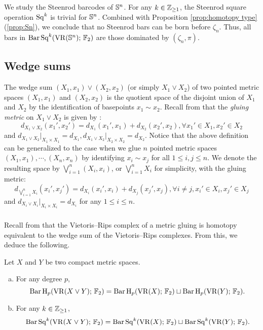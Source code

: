 \subsubsection{} We study the Steenrod barcodes of $\mathbb{S}^n$.
For any $k \in \mathbb{Z}_{\geq 1}$, the Steenrod square operation $\operatorname{Sq}^k$ is trivial for $\mathbb{S}^n$.
Combined with Proposition \ref{prop:homotopy type} (\ref{prop:Sn}), we conclude that no Steenrod bars can be born before $\zeta_n$.
Thus, all bars in $\operatorname{Bar}\operatorname{Sq}^{k}(\operatorname{VR}(\mathbb{S}^n);\,{\mathbb{F}_2})$ are those dominated by $(\zeta_n,\pi)$.

\subsection{Wedge sums}

The wedge sum $(X_1, x_1) \vee (X_2, x_2)$ (or simply $X_1 \vee X_2$) of two pointed metric spaces $(X_1, x_1)$ and $(X_2, x_2)$ is the quotient space of the disjoint union of $X_1$ and $X_2$ by the identification of basepoints $x_1 \sim x_2$.
Recall from \cite{burago2001course} that the \emph{gluing metric} on $X_1 \vee X_2$ is given by \label{para:gluing}:
\[
d_{X_1 \vee X_2}(x_1',x_2') = d_{X_1}(x_1',x_1)+d_{X_2}(x_2',x_2), \forall x_1' \in X_1, x_2' \in X_2
\]
and $d_{X_1 \vee X_2} \vert_{X_1 \times X_1} = d_{X_1},d_{X_1 \vee X_2} \vert_{X_2 \times X_2} = d_{X_2}$.
Notice that the above definition can be generalized to the case when we glue $n$ pointed metric spaces $(X_1,x_1),\cdots,(X_n,x_n)$ by identifying $x_i\sim x_j$ for all $1 \leq i,j\leq n$.
We denote the resulting space by $\bigvee_{i=1}^n (X_i,x_i)$, or $\bigvee_{i=1}^n X_i$ for simplicity, with the gluing metric:
\[
d_{\bigvee_{i=1}^n X_i}(x_i',x_j') = d_{X_i}(x_i',x_i)+d_{X_j}(x_j',x_j),\forall i\neq j, x_i' \in X_i, x_j' \in X_j
\]
and $d_{X_i \vee X_i}|_{X_i\times X_i} = d_{X_i}$ for any $1\leq i\leq n$.

\subsubsection{}\label{prop:wedge sum}
Recall from \cite[Proposition 3.7]{adamaszek2020homotopy} that the Vietoris--Rips complex of a metric gluing is homotopy equivalent to the wedge sum of the Vietoris--Rips complexes.
From this, we deduce the following.

\medskip\proposition
Let $X$ and $Y$ be two compact metric spaces.
\begin{enumerate}[(a)]
	\item\label{prop:wedge sum pH} For any degree $p$,
	\begin{equation*}\label{eq:wedge sum pH}
		\operatorname{Bar} \operatorname{H}_{p}(\operatorname{VR}(X \vee Y);\,{\mathbb{F}_2})= \operatorname{Bar} \operatorname{H}_{p}(\operatorname{VR}(X);\,{\mathbb{F}_2})\sqcup \operatorname{Bar} \operatorname{H}_{p}(\operatorname{VR}(Y);\,{\mathbb{F}_2}).
	\end{equation*}
	\item\label{prop:wedge sum Sq} For any $k \in \mathbb{Z}_{\geq 1}$,
	\begin{equation*}\label{eq:wedge sum Sq}
		\operatorname{Bar}\operatorname{Sq}^{k}(\operatorname{VR}(X \vee Y);\,{\mathbb{F}_2})= \operatorname{Bar}\operatorname{Sq}^{k}(\operatorname{VR}(X);\,{\mathbb{F}_2})\sqcup \operatorname{Bar}\operatorname{Sq}^{k}(\operatorname{VR}(Y);\,{\mathbb{F}_2}).
	\end{equation*}
\end{enumerate}

